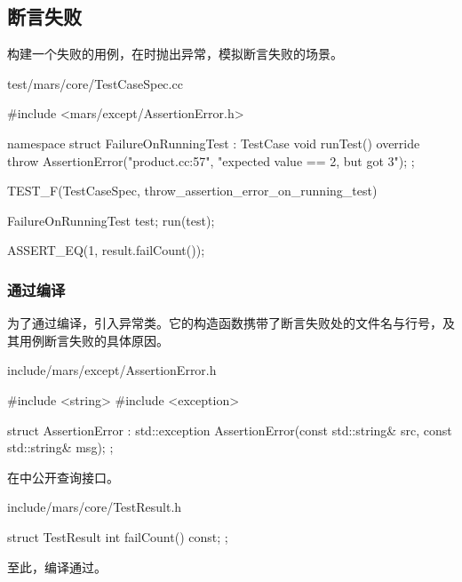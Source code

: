 \begin{content}

\subsection{断言失败}

构建一个失败的用例，在时抛出异常，模拟断言失败的场景。

\begin{nodiff}{test/mars/core/TestCaseSpec.cc}
 \begin{c++}
#include <mars/except/AssertionError.h>

namespace {
  struct FailureOnRunningTest : TestCase {
    void runTest() override {
      throw AssertionError("product.cc:57", "expected value == 2, but got 3");
    }
  };
}

TEST_F(TestCaseSpec, throw_assertion_error_on_running_test) {
  FailureOnRunningTest test;
  run(test);

  ASSERT_EQ(1, result.failCount());
}
 \end{c++}
\end{nodiff}

\subsubsection{通过编译}

为了通过编译，引入异常类。它的构造函数携带了断言失败处的文件名与行号，及其用例断言失败的具体原因。

\begin{nodiff}{include/mars/except/AssertionError.h}
 \begin{c++}
#include <string>
#include <exception>

struct AssertionError : std::exception {
  AssertionError(const std::string& src, const std::string& msg);
};
 \end{c++}
\end{nodiff}

在中公开查询接口。

\begin{nodiff}{include/mars/core/TestResult.h}
 \begin{c++}
struct TestResult {
  int failCount() const;
};
 \end{c++}
\end{nodiff}

至此，编译通过。


\end{content}
